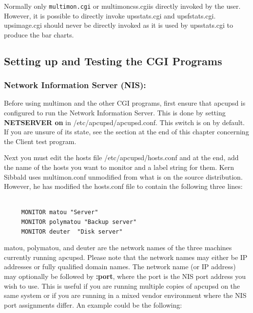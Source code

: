{{{{{{{Normally only {\tt multimon.cgi} or multimoncss.cgiis directly invoked by the
user. However, it is possible to directly invoke upsstats.cgi and
upsfstats.cgi. upsimage.cgi should never be directly invoked as it is used by
upsstats.cgi to produce the bar charts. 

\label{Setting-up-and-Testing-the-CGI-Programs}

\subsection*{Setting up and Testing the CGI Programs}

\label{index-Setup-CGI-programs-122}
\label{index-Testing-CGI-programs-123}

\label{Network-Information-Server-_005bNIS_005d}

\subsubsection*{Network Information Server (NIS):}

\label{index-Network-Information-Server-124}
\label{index-NIS-125}
Before using multimon and the other CGI programs, first ensure that apcupsd is
configured to run the Network Information Server. This is done by setting {\bf
NETSERVER on} in /etc/apcupsd/apcupsd.conf.  This switch is on by default.  If
you are unsure of its state, see the section at the end of this chapter
concerning the Client test program.  

Next you must edit the hosts file /etc/apcupsd/hosts.conf and at the end, add
the name of the hosts you want to monitor and a label string for them. Kern
Sibbald uses multimon.conf unmodified from what is on the source distribution.
However, he has modified the hosts.conf file to contain the following three
lines: 

\footnotesize
\begin{verbatim}
     
     MONITOR matou "Server"
     MONITOR polymatou "Backup server"
     MONITOR deuter  "Disk server"
\end{verbatim}
\normalsize

matou, polymatou, and deuter are the network names of the three machines
currently running apcupsd. Please note that the network names may either be IP
addresses or fully qualified domain names.  The network name (or IP address)
may optionally be followed by {\bf :\lt{}port\gt{}}, where the port is the NIS
port address you wish to use. This is useful if you are running multiple
copies of apcupsd on the same system or if you are running in a mixed vendor
environment where the NIS port assignments differ. An example could be the
following: 

}}}}}}}
